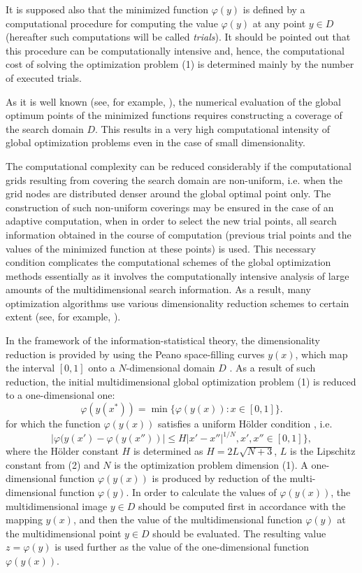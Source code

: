 \documentclass[12pt]{amsart}
\begin{document}
It is supposed also that the minimized function $\varphi(y)$ is defined by a computational procedure for computing the value $\varphi(y)$ at any point $y \in D$ (hereafter such computations will be called \textit{trials}). It should be pointed out that this procedure can be computationally intensive and, hence, the computational cost of solving the optimization problem (1) is determined mainly by the number of executed trials. 

As it is well known (see, for example, \cite{Strongin1}), the numerical evaluation of the global optimum points of the minimized functions requires constructing a coverage of the search domain $D$. This results in a very high computational intensity of global optimization problems even in the case of small dimensionality.

The computational complexity can be reduced considerably if the computational grids resulting from covering the search domain are non-uniform, i.e. when the grid nodes are distributed denser around the global optimal point only. The construction of such non-uniform coverings may be ensured in the case of an adaptive computation, when in order to select the new trial points, all search information obtained in the course of computation (previous trial points and the values of the minimized function at these points) is used. This necessary condition complicates the computational schemes of the global optimization methods essentially as it involves the computationally intensive analysis of large amounts of the multidimensional search information. As a result, many optimization algorithms use various dimensionality reduction schemes to certain extent (see, for example, \cite{Strongin1, Strongin2, Sergeyev2}).

In the framework of the information-statistical theory, the dimensionality reduction is provided by using the Peano space-filling curves $y(x)$, which map the interval $[0, 1]$ onto a $N$-dimensional domain $D$ \cite{Strongin1, Sergeyev2, Strongin3}. As a result of such reduction, the initial multidimensional global optimization problem (1) is reduced to a one-dimensional one:
\begin{equation}
\varphi(y(x^\ast)) = \min\{\varphi(y(x)): x \in [0,1]\}.
\end{equation}
for which the function $\varphi(y(x))$ satisfies a uniform H\"older condition \cite{Strongin1}, i.e.
\begin{equation}
|\varphi(y(x')-\varphi(y(x''))| \leq H|x' - x''|^{1/N}, x', x'' \in [0,1]\},
\end{equation}
where the H\"older constant $H$ is determined as $H = 2L\sqrt{N + 3}$, $L$ is the Lipschitz constant from (2) and $N$ is the optimization problem dimension (1). A one-dimensional function $\varphi(y(x))$ is produced by reduction of the multi-dimensional function $\varphi(y)$. In order to calculate the values of $\varphi(y(x))$, the multidimensional image $y \in D$ should be computed first in accordance with the mapping $y(x)$, and then the value of the multidimensional function $\varphi(y)$ at the multidimensional point $y \in D$ should be evaluated. The resulting value $z = \varphi(y)$ is used further as the value of the one-dimensional function $\varphi(y(x))$.
\end{document}
